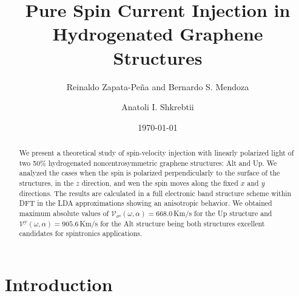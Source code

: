 \documentclass[prb,11pt,tightenlines,twocolumn,aps]{revtex4-1}
\begin{document}
\title{Pure Spin Current Injection in Hydrogenated Graphene Structures}
\author{Reinaldo Zapata-Pe\~na and
        Bernardo S. Mendoza}
\author{Anatoli I. Shkrebtii}

\date{\today}

\begin{abstract}
We present a theoretical study of spin-velocity injection with linearly
polarized light of two 50\% hydrogenated noncentrosymmetric graphene structures:
Alt and Up. We analyzed the cases when the spin is polarized perpendicularly to
the surface of the structures, in the $z$ direction, and wen the spin moves
along the fixed $x$ and $y$ directions. The results are calculated in a full
electronic band structure scheme within DFT in the LDA approximations showing an
anisotropic behavior. We obtained maximum absolute values of
$\mathcal{V}_{\sigma^{\mathrm{z}}} (\omega,\alpha) = 668.0$\,Km/s for the Up
structure and $\mathcal{V}^{\mathrm{y}} (\omega,\alpha) = 905.6$\,Km/s for the
Alt structure being both structures excellent candidates for spintronics
applications.
\end{abstract}

\maketitle


\section{Introduction}
\label{sec:introduction}
\end{document}

